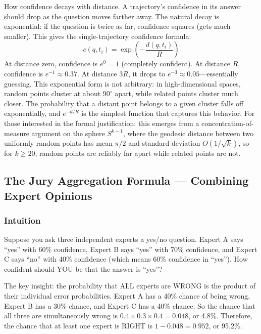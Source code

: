\documentclass[11pt]{article}
\begin{document}
How confidence decays with distance. A trajectory's confidence in its
answer should drop as the question moves farther away. The natural decay is
exponential: if the question is twice as far, confidence squares (gets much
smaller). This gives the single-trajectory confidence formula:
\begin{equation}\label{eq:single_trial}
c(q, t_i) = \exp\left(-\frac{d(q, t_i)}{R}\right)
\end{equation}
At distance zero, confidence is $e^0 = 1$ (completely confident). At distance
$R$, confidence is $e^{-1} \approx 0.37$. At distance $3R$, it drops to
$e^{-3} \approx 0.05$---essentially guessing. This exponential form is not
arbitrary: in high-dimensional spaces, random points cluster at about $90^\circ$
apart, while related points cluster much closer. The probability that a distant
point belongs to a given cluster falls off exponentially, and $e^{-d/R}$ is the
simplest function that captures this behavior. For those interested in the
formal justification: this emerges from a concentration-of-measure argument on
the sphere $S^{k-1}$, where the geodesic distance between two uniformly random
points has mean $\pi/2$ and standard deviation $O(1/\sqrt{k})$, so for $k \ge
20$, random points are reliably far apart while related points are not.

\subsection{The Jury Aggregation Formula — Combining Expert Opinions}

\subsubsection*{Intuition}

Suppose you ask three independent experts a yes/no question. Expert A says
``yes'' with 60\% confidence, Expert B says ``yes'' with 70\% confidence, and
Expert C says ``no'' with 40\% confidence (which means 60\% confidence in
``yes''). How confident should YOU be that the answer is ``yes''?

The key insight: the probability that ALL experts are WRONG is the product of
their individual error probabilities. Expert A has a 40\% chance of being
wrong, Expert B has a 30\% chance, and Expert C has a 40\% chance. So the
chance that all three are simultaneously wrong is $0.4 \times 0.3 \times 0.4
= 0.048$, or 4.8\%. Therefore, the chance that at least one expert is RIGHT
is $1 - 0.048 = 0.952$, or 95.2\%.
\end{document}
